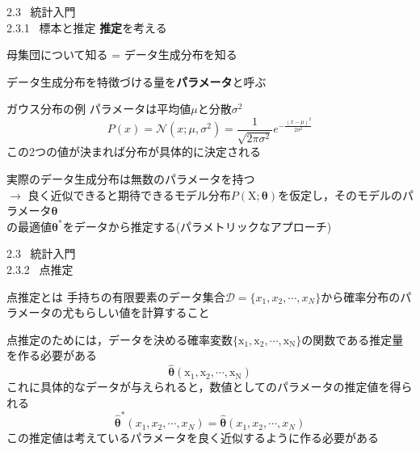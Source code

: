 \documentclass[dvipdfmx,10pt]{beamer}
\begin{document}
  \begin{frame}[t]{2.3 \ 統計入門 \\ \normalsize{2.3.1 \ 標本と推定}}
    \textbf{推定}を考える\\
    \begin{center}
      母集団について知る = データ生成分布を知る
    \end{center}
    データ生成分布を特徴づける量を\textbf{パラメータ}と呼ぶ
    \begin{exampleblock}{ガウス分布の例}
      パラメータは平均値$\mu$と分散$\sigma^2$
      \begin{equation*}
        P(x)=\mathcal{N}(x;\mu,\sigma^2)=\frac{1}{\sqrt{2\pi \sigma^2}}e^{-\frac{(x-\mu)^2}{2\sigma^2}}
      \end{equation*}
      この2つの値が決まれば分布が具体的に決定される
    \end{exampleblock}
    実際のデータ生成分布は無数のパラメータを持つ\\
    $\rightarrow$ 良く近似できると期待できるモデル分布$P(\mathrm{X};\bm{\theta})$を仮定し，そのモデルのパラメータ$\bm{\theta}$\\の最適値$\bm{\theta}^*$をデータから推定する(パラメトリックなアプローチ)
  \end{frame}

  \begin{frame}[t]{2.3 \ 統計入門 \\ \normalsize{2.3.2 \ 点推定}}
    \begin{block}{点推定とは}
      手持ちの有限要素のデータ集合$\mathcal{D}=\{x_1,x_2,\cdots,x_N\}$から確率分布のパラメータの尤もらしい値を計算すること
    \end{block}
    点推定のためには，データを決める確率変数$\{\mathrm{x_1},\mathrm{x_2},\cdots,\mathrm{x_N}\}$の関数である推定量を作る必要がある
    \begin{equation*}
      \hat{\bm{\theta}}(\mathrm{x_1},\mathrm{x_2},\cdots,\mathrm{x_N})
    \end{equation*}
    これに具体的なデータが与えられると，数値としてのパラメータの推定値を得られる
    \begin{equation*}
      \hat{\bm{\theta}}^*(x_1,x_2,\cdots,x_N) = \hat{\bm{\theta}}(x_1,x_2,\cdots,x_N)
    \end{equation*}
    この推定値は考えているパラメータを良く近似するように作る必要がある
  \end{frame}
\end{document}
